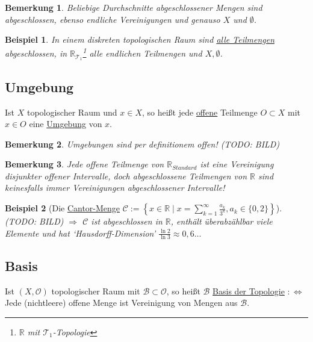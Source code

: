 \documentclass[a4paper,11pt,notitlepage]{report}
\newtheorem{remark}{Bemerkung}[chapter]
\newtheorem{example}{Beispiel}[chapter]
\newcommand{\R}{{\ensuremath{\mathbb{R}}}}
\newcommand{\OO}{{\ensuremath{\mathcal{O}}}}
\newenvironment{Kasten}[1]
{
\hspace{0.05\linewidth}
\begin{center}
\begin{minipage}{0.9\linewidth}
\setlength{\fboxsep}{10pt}
\definecolor{shadecolor}{gray}{1}
\definecolor{framecolor}{gray}{0}
\def\FrameCommand{\fcolorbox{framecolor}{shadecolor}}
\MakeFramed {\FrameRestore}
\subsection{#1}
\begin{itshape}
}
{
\end{itshape}
\endMakeFramed
\end{minipage}
\end{center}
}
\begin{document}
\begin{remark}
	Beliebige Durchschnitte abgeschlossener Mengen sind abgeschlossen, ebenso endliche Vereinigungen und genauso $X$ und $\emptyset$.
\end{remark}

\begin{example}
	In einem diskreten topologischen Raum sind \underline{alle Teilmengen} abgeschlossen, in $\R_{\mathcal{T}_1}$\footnote{$\R$ mit $\mathcal{T}_1$-Topologie} alle endlichen Teilmengen und $X, \emptyset$.
\end{example}

\begin{Kasten}{Umgebung}
	Ist $X$ topologischer Raum und $x \in X$, so heißt jede \underline{offene} Teilmenge $O \subset X$ mit $x \in O$ eine \underline{Umgebung} von $x$.
\end{Kasten}

\begin{remark}
	Umgebungen sind per definitionem offen! (TODO: BILD)
\end{remark}

\begin{remark}
	Jede offene Teilmenge von $\R_{Standard}$ ist eine Vereinigung disjunkter offener Intervalle, doch abgeschlossene Teilmengen von $\R$ sind keinesfalls immer Vereinigungen abgeschlossener Intervalle!
\end{remark}

\begin{example}[Die \underline{Cantor-Menge} $\mathcal{C}:= \left \{ x \in \R \mid x = \sum\limits_{k=1}^{\infty}{\frac{a_k}{3^k}}, a_k \in \{0,2\} \right \}$]
	(TODO: BILD)
	\newline
	$\Rightarrow$ $\mathcal{C}$ ist abgeschlossen in $\R$, enthält überabzählbar viele Elemente und hat `Hausdorff-Dimension' $\frac{\ln 2}{\ln 3} \approx 0,6 \ldots$
\end{example}

\begin{Kasten}{Basis}
	Ist $(X, \OO)$ topologischer Raum mit $\mathcal{B} \subset \OO$, so heißt $\mathcal{B}$ \underline{Basis der Topologie} $:\Leftrightarrow$ Jede (nichtleere) offene Menge ist Vereinigung von Mengen aus $\mathcal{B}$.
\end{Kasten}
\end{document}
